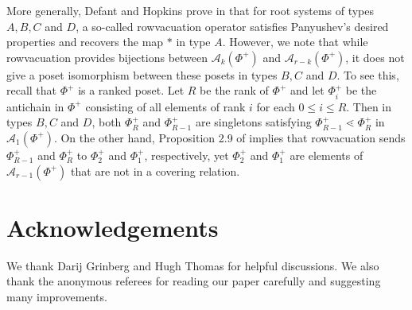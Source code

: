 \documentclass[11pt]{amsart}
\theoremstyle{plain}
\theoremstyle{definition}
\theoremstyle{remark}
\numberwithin{equation}{section}
\newcommand{\cala}{\mathcal{A}}
\begin{document}
More generally, Defant and Hopkins prove in \cite{DefantHopkins} that for root
systems of types $A, B, C$ and $D$, a so-called {rowvacuation} operator
satisfies Panyushev's desired properties and recovers the map $*$ in type $A$.
However, we note that while rowvacuation provides bijections between
$\cala_k(\Phi^+)$ and $\cala_{r-k}(\Phi^+)$, it does not give a poset
isomorphism between these posets in types $B,C$ and $D$. To see this, recall
that $\Phi^+$ is a ranked poset. Let $R$ be the rank of  $\Phi^+$ and let
$\Phi^+_i$ be the antichain in $\Phi^+$ consisting of all elements of rank $i$
for each $0\le i\le R$.  Then in types $B,C$ and $D$, both $\Phi^+_R$ and
$\Phi^+_{R-1}$ are singletons satisfying $\Phi^+_{R-1}\lessdot \Phi^{+}_{R}$ in
$\cala_1(\Phi^+)$. On the other hand, Proposition 2.9 of \cite{DefantHopkins}
implies that rowvacuation sends $\Phi^+_{R-1}$ and $\Phi^+_{R}$ to $\Phi^+_{2}$
and $\Phi^+_1$, respectively, yet $\Phi^+_2$ and $\Phi^+_1$ are elements of
$\cala_{r-1}(\Phi^+)$ that are not in a covering relation.








\section*{Acknowledgements}
We thank Darij Grinberg and Hugh Thomas for helpful discussions. We also thank
the anonymous referees for reading our paper carefully and suggesting many
improvements.




\end{document}
